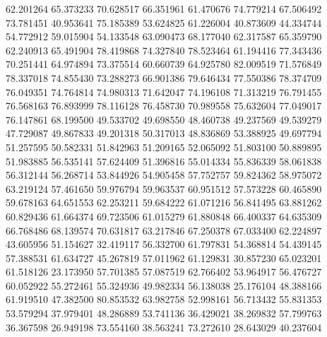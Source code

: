 62.201264
65.373233
70.628517
66.351961
61.470676
74.779214
67.506492
73.781451
40.953641
75.185389
53.624825
61.226004
40.873609
44.334744
54.772912
59.015904
54.133548
63.090473
68.177040
62.317587
65.359790
62.240913
65.491904
78.419868
74.327840
78.523464
61.194416
77.343436
70.251441
64.974894
73.375514
60.660739
64.925780
82.009519
71.576849
78.337018
74.855430
73.288273
66.901386
79.646434
77.550386
78.374709
76.049351
74.764814
74.980313
71.642047
74.196108
71.313219
76.791455
76.568163
76.893999
78.116128
76.458730
70.989558
75.632604
77.049017
76.147861
68.199500
49.533702
49.698550
48.460738
49.237569
49.539279
47.729087
49.867833
49.201318
50.317013
48.836869
53.388925
49.697794
51.257595
50.582331
51.842963
51.209165
52.065092
51.803100
50.889895
51.983885
56.535141
57.624409
51.396816
55.014334
55.836339
58.061838
56.312144
56.268714
53.844926
54.905458
57.752757
59.824362
58.975072
63.219124
57.461650
59.976794
59.963537
60.951512
57.573228
60.465890
59.678163
64.651553
62.253211
59.684222
61.071216
56.841495
63.881262
60.829436
61.664374
69.723506
61.015279
61.880848
66.400337
64.635309
66.768486
68.139574
70.631817
63.217846
67.250378
67.033400
62.224897
43.605956
51.154627
32.419117
56.332700
61.797831
54.368814
54.439145
57.388531
61.634727
45.267819
57.011962
61.129831
30.857230
65.023201
61.518126
23.173950
57.701385
57.087519
62.766402
53.964917
56.476727
60.052922
55.272461
55.324936
49.982334
56.138038
25.176104
48.388166
61.919510
47.382500
80.853532
63.982758
52.998161
56.713432
55.831353
53.579294
37.979401
48.286889
53.741136
36.429021
38.269832
57.799763
36.367598
26.949198
73.554160
38.563241
73.272610
28.643029
40.237604
